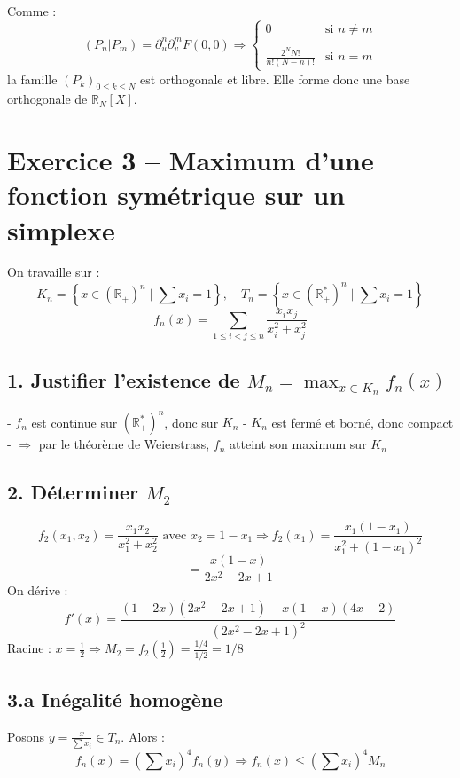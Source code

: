 \documentclass[a4paper,12pt]{article}
\begin{document}
Comme :
\[
(P_n | P_m) = \partial_u^n \partial_v^m F(0,0)
\Rightarrow
\begin{cases}
0 &\text{si } n \ne m \\\\
\frac{2^N N!}{n!(N - n)!} &\text{si } n = m
\end{cases}
\]
la famille \((P_k)_{0 \leq k \leq N}\) est orthogonale et libre. Elle forme donc une base orthogonale de \(\mathbb{R}_N[X]\).
\section*{Exercice 3 -- Maximum d'une fonction symétrique sur un simplexe}

On travaille sur :
\[
K_n = \left\{ x \in (\mathbb{R}_+)^n \mid \sum x_i = 1 \right\}, \quad
T_n = \left\{ x \in (\mathbb{R}_+^*)^n \mid \sum x_i = 1 \right\}
\]
\[
f_n(x) = \sum_{1 \le i < j \le n} \frac{x_i x_j}{x_i^2 + x_j^2}
\]

\subsection*{1. Justifier l'existence de \(M_n = \max_{x \in K_n} f_n(x)\)}

- \(f_n\) est continue sur \((\mathbb{R}_+^*)^n\), donc sur \(K_n\)
- \(K_n\) est fermé et borné, donc compact
- \(\Rightarrow\) par le théorème de Weierstrass, \(f_n\) atteint son maximum sur \(K_n\)

\subsection*{2. Déterminer \(M_2\)}

\[
f_2(x_1,x_2) = \frac{x_1 x_2}{x_1^2 + x_2^2}
\text{ avec } x_2 = 1 - x_1
\Rightarrow
f_2(x_1) = \frac{x_1(1 - x_1)}{x_1^2 + (1 - x_1)^2}
\]
\[
= \frac{x(1 - x)}{2x^2 - 2x + 1}
\]
On dérive :
\[
f'(x) = \frac{(1 - 2x)(2x^2 - 2x + 1) - x(1 - x)(4x - 2)}{(2x^2 - 2x + 1)^2}
\]
Racine : \(x = \frac{1}{2} \Rightarrow M_2 = f_2\left(\frac{1}{2}\right) = \frac{1/4}{1/2} = \boxed{1/8}\)

\subsection*{3.a Inégalité homogène}

Posons \(y = \frac{x}{\sum x_i} \in T_n\). Alors :
\[
f_n(x) = \left(\sum x_i\right)^4 f_n(y) \Rightarrow
f_n(x) \leq \left(\sum x_i\right)^4 M_n
\]
\end{document}
